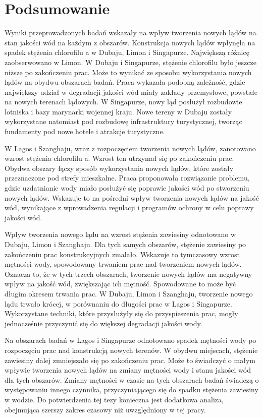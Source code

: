 \documentclass{amuthesis}
\begin{document}

\hypertarget{podsumowanie}{%
\chapter{Podsumowanie}\label{podsumowanie}}

Wyniki przeprowadzonych badań wskazały na wpływ tworzenia nowych lądów
na stan jakości wód na każdym z obszarów. Konstrukcja nowych lądów
wpłynęła na spadek stężenia chlorofilu a w Dubaju, Limon i Singapurze.
Największą różnicę zaobserwowano w Limon. W Dubaju i Singapurze,
stężenie chlorofilu było jeszcze niższe po zakończeniu prac. Może to
wynikać ze sposobu wykorzystania nowych lądów na obydwu obszarach badań.
Praca \textcite{zhang2017assessment} wykazała podobną zależność, gdzie
największy udział w degradacji jakości wód miały zakłady przemysłowe,
powstałe na nowych terenach lądowych. W Singapurze, nowy ląd posłużył
rozbudowie lotniska i bazy marynarki wojennej kraju. Nowe tereny w
Dubaju zostały wykorzystane natomiast pod rozbudowę infrastruktury
turystycznej, tworząc fundamenty pod nowe hotele i atrakcje turystyczne.

W Lagos i Szanghaju, wraz z rozpoczęciem tworzenia nowych lądów,
zanotowano wzrost stężenia chlorofilu a. Wzrost ten utrzymał się po
zakończeniu prac. Obydwa obszary łączy sposób wykorzystania nowych
lądów, które zostały przeznaczone pod strefy mieszkalne. Praca
\textcite{zhang2017assessment} proponowała rozwiązanie problemu, gdzie
uzdatnianie wody miało posłużyć się poprawie jakości wód po stworzeniu
nowych lądów. Wskazuje to na pośredni wpływ tworzenia nowych lądów na
jakość wód, wynikające z wprowadzenia regulacji i programów ochrony w
celu poprawy jakości wód.

Wpływ tworzenia nowego lądu na wzrost stężenia zawiesiny odnotowano w
Dubaju, Limon i Szanghaju. Dla tych samych obszarów, stężenie zawiesiny
po zakończeniu prac konstrukcyjnych zmalało. Wskazuje to tymczasowy
wzrost mętności wody, spowodowany trwaniem prac nad tworzeniem nowych
lądów. Oznacza to, że w tych trzech obszarach, tworzenie nowych lądów ma
negatywny wpływ na jakość wód, zwiększając ich mętność. Spowodowane to
może być długim okresem trwania prac. W Dubaju, Limon i Szanghaju,
tworzenie nowego lądu trwało krócej, w porównaniu do długości prac w
Lagos i Singapurze. Wykorzystane techniki, które przysłużyły się do
przyspieszenia prac, mogły jednocześnie przyczynić się do większej
degradacji jakości wody.

Na obszarach badań w Lagos i Singapurze odnotowano spadek mętności wody
po rozpoczęciu prac nad konstrukcją nowych terenów. W obydwu miejscach,
stężenie zawiesiny dalej zmniejszało się po zakończeniu prac. Może to
świadczyć o małym wpływie tworzenia nowych lądów na zmiany mętności wody
i stanu jakości wód dla tych obszarów. Zmiany mętności w czasie na tych
obszarach badań świadczą o występowaniu innego czynnika,
przyczyniającego się do spadku stężenia zawiesiny w wodzie. Do
potwierdzenia tej tezy konieczna jest dodatkowa analiza, obejmująca
szerszy zakres czasowy niż uwzględniony w tej pracy.
\end{document}
